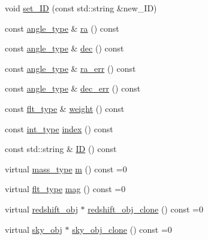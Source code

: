 \begin{DoxyCompactItemize}
\item 
void \hyperlink{classIceBRG_1_1sky__obj_a12bb3624db02ce53501b9f890205232d}{set\+\_\+\+I\+D} (const std\+::string \&new\+\_\+\+I\+D)
\item 
const \hyperlink{namespaceIceBRG_a688eeb0811a2474b20b667ed2e9625a1}{angle\+\_\+type} \& \hyperlink{classIceBRG_1_1sky__obj_a2304bc2a67be4857348f3f51cde5daee}{ra} () const 
\item 
const \hyperlink{namespaceIceBRG_a688eeb0811a2474b20b667ed2e9625a1}{angle\+\_\+type} \& \hyperlink{classIceBRG_1_1sky__obj_a72579026fc6c7f6266dc29a3913e44ae}{dec} () const 
\item 
const \hyperlink{namespaceIceBRG_a688eeb0811a2474b20b667ed2e9625a1}{angle\+\_\+type} \& \hyperlink{classIceBRG_1_1sky__obj_ab39fc2800215b15fc6475f4037f2063c}{ra\+\_\+err} () const 
\item 
const \hyperlink{namespaceIceBRG_a688eeb0811a2474b20b667ed2e9625a1}{angle\+\_\+type} \& \hyperlink{classIceBRG_1_1sky__obj_a69349148162a272f1e67590121d4836e}{dec\+\_\+err} () const 
\item 
const \hyperlink{lib_2IceBRG__main_2common_8h_ad0f130a56eeb944d9ef2692ee881ecc4}{flt\+\_\+type} \& \hyperlink{classIceBRG_1_1sky__obj_a5e7765e9c60a24e4849b6ef278631b96}{weight} () const 
\item 
const \hyperlink{lib_2IceBRG__main_2common_8h_ac4de9d9335536ac22821171deec8d39e}{int\+\_\+type} \hyperlink{classIceBRG_1_1sky__obj_ad25abf998cc346d25b085440509128bc}{index} () const 
\item 
const std\+::string \& \hyperlink{classIceBRG_1_1sky__obj_a2ad6a15bb72988061826898e57298c27}{I\+D} () const 
\item 
virtual \hyperlink{namespaceIceBRG_a1be72ac4918a9b029f2eefa084213e35}{mass\+\_\+type} \hyperlink{classIceBRG_1_1sky__obj_a5296e44c7c9d809c31d9326197527d17}{m} () const  =0
\item 
virtual \hyperlink{lib_2IceBRG__main_2common_8h_ad0f130a56eeb944d9ef2692ee881ecc4}{flt\+\_\+type} \hyperlink{classIceBRG_1_1sky__obj_a40496172864c36f89d07bf54a52a9dc6}{mag} () const  =0
\item 
virtual \hyperlink{classIceBRG_1_1redshift__obj}{redshift\+\_\+obj} $\ast$ \hyperlink{classIceBRG_1_1sky__obj_a6efa97b5c6edb6c4ea741b06338ff5bc}{redshift\+\_\+obj\+\_\+clone} () const  =0
\item 
virtual \hyperlink{classIceBRG_1_1sky__obj}{sky\+\_\+obj} $\ast$ \hyperlink{classIceBRG_1_1sky__obj_a4b221bb8efb8ad5df2b03e53a077eeaa}{sky\+\_\+obj\+\_\+clone} () const  =0
\end{DoxyCompactItemize}


